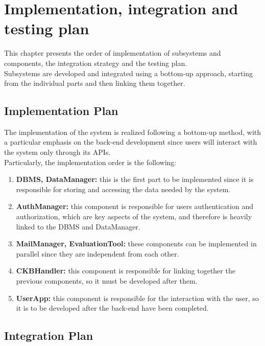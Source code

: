 \chapter{Implementation, integration and testing plan}
This chapter presents the order of implementation of subsystems and components, 
the integration strategy and the testing plan.\\
Subsystems are developed and integrated using a bottom-up approach, starting from the 
individual parts and then linking them together.\\

\section{Implementation Plan}
The implementation of the system is realized following a bottom-up method, with a particular 
emphasis on the back-end development since users will interact with the system only through 
its APIs.\\
Particularly, the implementation order is the following:
\begin{enumerate}
    \item \textbf{DBMS, DataManager:} this is the first part to be implemented since it is responsible 
    for storing and accessing the data needed by the system.
    \item \textbf{AuthManager:} this component is responsible for users authentication and authorization, 
    which are key aspects of the system, and therefore is heavily linked to the DBMS and DataManager.
    \item \textbf{MailManager, EvaluationTool:} these components can be implemented in parallel since they are 
    independent from each other.
    \item \textbf{CKBHandler:} this component is responsible for linking together the previous components, so 
    it must be developed after them.
    \item \textbf{UserApp:} this component is responsible for the interaction with the user, so it is to be 
    developed after the back-end have been completed.
\end{enumerate}
\section{Integration Plan}

